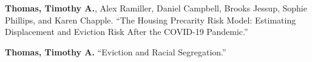 \begin{cvparagraph}


\textbf{Thomas, Timothy A.}, Alex Ramiller, Daniel Campbell, Brooks Jessup, Sophie Phillips, and Karen Chapple. “The Housing Precarity Risk Model: Estimating Displacement and Eviction Risk After the COVID-19 Pandemic.”

\end{cvparagraph}

\begin{cvparagraph}


\textbf{Thomas, Timothy A.} “Eviction and Racial Segregation.”

\end{cvparagraph}






